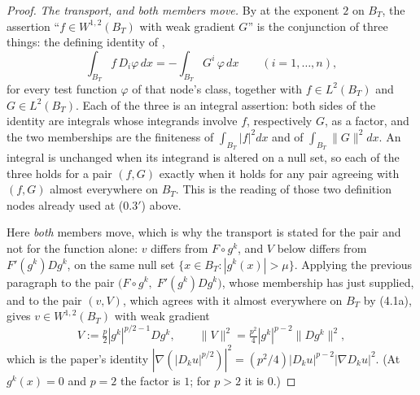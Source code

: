 \begin{proof}
\emph{The transport, and both members move.}  By  at the
exponent $2$ on $B_T$, the assertion ``$f\in W^{1,2}(B_T)$ with weak gradient
$G$'' is the conjunction of three things: the defining identity of
,
\[
\int_{B_T}f\,D_i\varphi\,dx=-\int_{B_T}G^i\,\varphi\,dx
\qquad(i=1,\dots,n),
\]
for every test function $\varphi$ of that node's class, together with
$f\in L^2(B_T)$ and $G\in L^2(B_T)$.  Each of the three is an integral
assertion: both sides of the identity are integrals whose integrands involve
$f$, respectively $G$, as a factor, and the two memberships are the finiteness
of $\int_{B_T}|f|^2dx$ and of $\int_{B_T}\|G\|^2dx$.  An integral is unchanged
when its integrand is altered on a null set, so each of the three holds for a
pair $(f,G)$ exactly when it holds for any pair agreeing with $(f,G)$ almost
everywhere on $B_T$.  This is the reading of those two definition nodes already
used at (0.3$'$) above.

Here \emph{both} members move, which is why the transport is stated for the
pair and not for the function alone: $v$ differs from $F\circ g^k$, and $V$
below differs from $F'(g^k)Dg^k$, on the same null set
$\{x\in B_T:|g^k(x)|>\mu\}$.  Applying the previous paragraph to the pair
$\bigl(F\circ g^k,\;F'(g^k)Dg^k\bigr)$, whose membership
 has just supplied, and to the pair $(v,V)$, which
agrees with it almost everywhere on $B_T$ by (4.1a), gives
$v\in W^{1,2}(B_T)$ with weak gradient
\[
V:=\tfrac p2|g^k|^{p/2-1}Dg^k,\qquad
\|V\|^2=\tfrac{p^2}4|g^k|^{p-2}\|Dg^k\|^2 ,
\tag{4.2}
\]
which is the paper's identity
$|\nabla(|D_ku|^{p/2})|^2=(p^2/4)|D_ku|^{p-2}|\nabla D_ku|^2$.  (At
$g^k(x)=0$ and $p=2$ the factor is $1$; for $p>2$ it is $0$.)


\end{proof}
